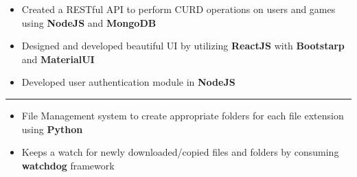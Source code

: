 \begin{itemize}
    \item Created a RESTful API to perform CURD operations on users and games using \textbf{NodeJS} and \textbf{MongoDB}
    \item Designed and developed beautiful UI by utilizing \textbf{ReactJS} with \textbf{Bootstarp} and \textbf{MaterialUI}
    \item Developed user authentication module in \textbf{NodeJS} 
\end{itemize}

\rule{\linewidth}{0.2pt}

\begin{itemize}
    \item File Management system to create appropriate folders for each file extension using \textbf{Python}
    \item Keeps a watch for newly downloaded/copied files and folders by consuming \textbf{watchdog} framework
\end{itemize}




